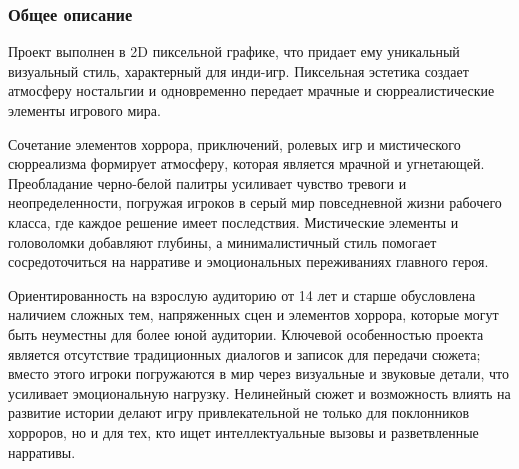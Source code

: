 \documentclass{article}
\begin{document}
	\subsubsection{Общее описание}
	Проект выполнен в 2D пиксельной графике, что придает ему уникальный визуальный стиль, характерный для инди-игр. Пиксельная эстетика создает атмосферу ностальгии и одновременно передает мрачные и сюрреалистические элементы игрового мира.
	
	Сочетание элементов хоррора, приключений, ролевых игр и мистического сюрреализма формирует атмосферу, которая является мрачной и угнетающей. Преобладание черно-белой палитры усиливает чувство тревоги и неопределенности, погружая игроков в серый мир повседневной жизни рабочего класса, где каждое решение имеет последствия. Мистические элементы и головоломки добавляют глубины, а минималистичный стиль помогает сосредоточиться на нарративе и эмоциональных переживаниях главного героя.
	
	Ориентированность на взрослую аудиторию от 14 лет и старше обусловлена наличием сложных тем, напряженных сцен и элементов хоррора, которые могут быть неуместны для более юной аудитории. Ключевой особенностью проекта является отсутствие традиционных диалогов и записок для передачи сюжета; вместо этого игроки погружаются в мир через визуальные и звуковые детали, что усиливает эмоциональную нагрузку. Нелинейный сюжет и возможность влиять на развитие истории делают игру привлекательной не только для поклонников хорроров, но и для тех, кто ищет интеллектуальные вызовы и разветвленные нарративы.
	
\end{document}
